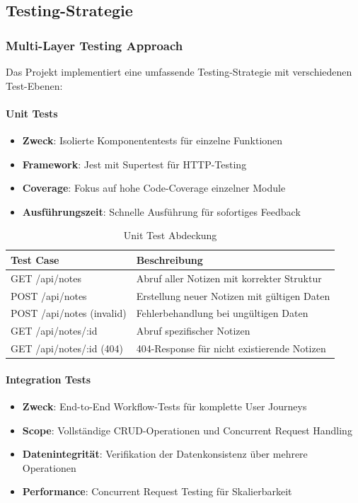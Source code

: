 \subsection{Testing-Strategie}

\subsubsection{Multi-Layer Testing Approach}
Das Projekt implementiert eine umfassende Testing-Strategie mit verschiedenen Test-Ebenen:

\paragraph{Unit Tests}
\begin{itemize}
    \item \textbf{Zweck}: Isolierte Komponententests für einzelne Funktionen
    \item \textbf{Framework}: Jest mit Supertest für HTTP-Testing
    \item \textbf{Coverage}: Fokus auf hohe Code-Coverage einzelner Module
    \item \textbf{Ausführungszeit}: Schnelle Ausführung für sofortiges Feedback
\end{itemize}

\begin{table}[h!]
    \centering
    \caption{Unit Test Abdeckung}
    \label{tab:unit-tests}
    \begin{tabular}{|l|l|}
    \hline
    \textbf{Test Case} & \textbf{Beschreibung} \\ \hline
    GET /api/notes & Abruf aller Notizen mit korrekter Struktur \\ \hline
    POST /api/notes & Erstellung neuer Notizen mit gültigen Daten \\ \hline
    POST /api/notes (invalid) & Fehlerbehandlung bei ungültigen Daten \\ \hline
    GET /api/notes/:id & Abruf spezifischer Notizen \\ \hline
    GET /api/notes/:id (404) & 404-Response für nicht existierende Notizen \\ \hline
    \end{tabular}
\end{table}

\paragraph{Integration Tests}
\begin{itemize}
    \item \textbf{Zweck}: End-to-End Workflow-Tests für komplette User Journeys
    \item \textbf{Scope}: Vollständige CRUD-Operationen und Concurrent Request Handling
    \item \textbf{Datenintegrität}: Verifikation der Datenkonsistenz über mehrere Operationen
    \item \textbf{Performance}: Concurrent Request Testing für Skalierbarkeit
\end{itemize}

